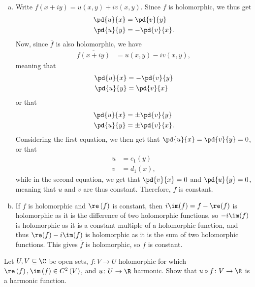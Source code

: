 \documentclass[10pt]{mypackage}
\begin{document}
\begin{solution}\hfill
  \begin{enumerate}[(a)]
    \item Write $f\left( x + iy \right) = u\left( x,y \right) + i v\left( x,y \right)$. Since $f$ is holomorphic, we thus get
      \begin{align*}
        \pd{u}{x} &= \pd{v}{y}\\
        \pd{u}{y} &= - \pd{v}{x}.
      \end{align*}
      Now, since $ \overline{f} $ is also holomorphic, we have
      \begin{align*}
        \overline{f\left( x + iy \right)} &= u\left( x,y \right) - i v\left( x,y \right),
      \end{align*}
      meaning that
      \begin{align*}
        \pd{u}{x} &= - \pd{v}{y}\\
        \pd{u}{y} &= \pd{v}{x}
      \end{align*}
      or that
      \begin{align*}
        \pd{u}{x} &= \pm \pd{v}{y}\\
        \pd{u}{y} &= \pm \pd{v}{x}.
      \end{align*}
      Considering the first equation, we then get that $ \pd{u}{x} = \pd{v}{y} = 0 $, or that
      \begin{align*}
        u &= c_1(y)\\
        v &= d_1(x),
      \end{align*}
      while in the second equation, we get that $ \pd{v}{x} = 0 $ and $ \pd{u}{y} = 0 $, meaning that $u$ and $v$ are thus constant. Therefore, $f$ is constant.
    \item If $f$ is holomorphic and $\re\left( f \right)$ is constant, then $i \im(f) = f-\re(f)$ is holomorphic as it is the difference of two holomorphic functions, so $-i\im(f)$ is holomorphic as it is a constant multiple of a holomorphic function, and thus $ \re(f) - i\im(f) $ is holomorphic as it is the sum of two holomorphic functions. This gives $ \overline{f} $ is holomorphic, so $f$ is constant.
  \end{enumerate}
\end{solution}
\begin{problem}[Problem 3]
  Let $U,V\subseteq \C$ be open sets, $f\colon V\rightarrow U$ holomorphic for which $\re\left( f \right),\im\left( f \right)\in C^2\left( V \right)$, and $u\colon U\rightarrow \R$ harmonic. Show that $u\circ f\colon V\rightarrow \R$ is a harmonic function.
\end{problem}
\end{document}
